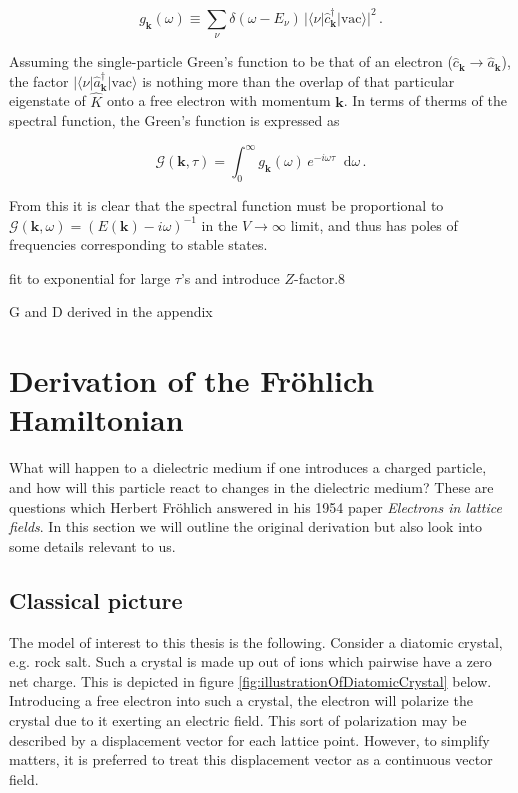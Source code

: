 \documentclass[12pt]{report}
\renewcommand{\vec}[1]{\boldsymbol{\mathbf{#1}}}                        %
\newcommand*\diff{\mathop{}\!\mathrm{d}}
\newcommand{\Gt}{\mathcal{G}}
\newcommand{\todo}[1]{{\leavevmode\color{todo}#1}}
\begin{document}
 \begin{equation}
	g_{\vec{k}} (\omega)
	\equiv \sum_\nu \delta (\omega - E_\nu) \, | \langle \nu | \hat c^\dagger_{\vec k} | \text{vac} \rangle |^2 \,.
\end{equation}

Assuming the single-particle Green's function to be that of an electron ($ \hat c_{\vec k} \rightarrow \hat a_{\vec k} $), the factor $ | \langle \nu | \hat a^\dagger_{\vec k} | \text{vac} \rangle $ is nothing more than the overlap of that particular eigenstate of $ \hat K $ onto a free electron with momentum $ \vec k $. In terms of therms of the spectral function, the Green's function is expressed as

\begin{equation}
	\Gt(\vec k, \tau) = \int_0^\infty g_{\vec k} (\omega) \, e^{-i \omega \tau} \diff \omega \,.
\end{equation}

From this it is clear that the spectral function must be proportional to $ \Gt(\vec k, \omega) = (E(\vec k) - i \omega)^{-1} $ in the $ V \rightarrow \infty $ limit, and thus has poles of frequencies corresponding to stable states.






\todo{fit to exponential  for large $ \tau $'s and introduce $ Z $-factor.8}

\todo{G and D derived in the appendix}

\section{Derivation of the Fröhlich Hamiltonian}


What will happen to a dielectric medium if one introduces a charged particle, and how will this particle react to changes in the dielectric medium? These are questions which Herbert Fröhlich answered in his 1954 paper \textit{Electrons in lattice fields}\cite{electronsInLatticeFields}. In this section we will outline the original derivation but also look into some details relevant to us.

\subsection{Classical picture}

The model of interest to this thesis is the following. Consider a diatomic crystal, e.g. rock salt. Such a crystal is made up out of ions which pairwise have a zero net charge. This is depicted in figure \ref{fig:illustrationOfDiatomicCrystal} below. Introducing a free electron into such a crystal, the electron will polarize the crystal due to it exerting an electric field. This sort of polarization may be described by a displacement vector for each lattice point. However, to simplify matters, it is preferred to treat this displacement vector as a continuous vector field.
\end{document}
